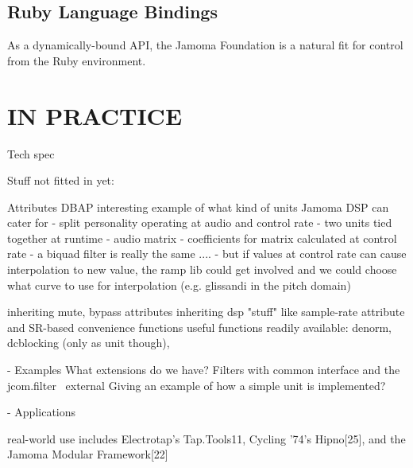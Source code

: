 \documentclass[twoside,10pt]{article}
\begin{document}



\subsection{Ruby Language Bindings} %

As a dynamically-bound API, the Jamoma Foundation is a natural fit for control from the Ruby environment.  






\section{IN PRACTICE} %
Tech spec



Stuff not fitted in yet:

    Attributes
    DBAP interesting example of what kind of units Jamoma DSP can cater for
        - split personality operating at audio and control rate
            - two units tied together at runtime
                - audio matrix
                - coefficients for matrix calculated at control rate
        - a biquad filter is really the same ....
            - but if values at control rate can cause interpolation to new value, the ramp lib could get involved and we could choose what curve to use for interpolation (e.g. glissandi in the pitch domain)

    inheriting mute, bypass attributes
    inheriting dsp "stuff" like sample-rate attribute and SR-based convenience functions
    useful functions readily available: denorm, dcblocking (only as unit though),  


    - Examples
        What extensions do we have?
            Filters with common interface and the jcom.filter~ external
        Giving an example of how a simple unit is implemented?


- Applications

    real-world use includes Electrotap’s Tap.Tools11, Cycling ’74’s Hipno[25], and the Jamoma Modular Framework[22]
\end{document}
